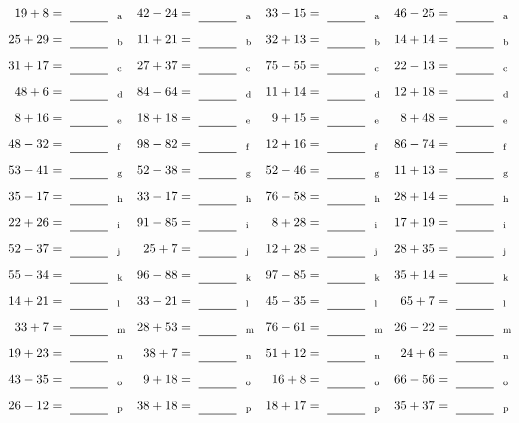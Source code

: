 \documentclass
[
  draft    = true,
  fontsize = 11pt,
  parskip  = half-
]
{scrartcl}
\begin{document}
\clearpage
\begin{align*}
    \pline{19+8}&=\rline{a}
  & \pline{42-24}&=\rline{a}
  & \pline{33-15}&=\rline{a}
  & \pline{46-25}&=\rline{a} \\[1ex]
    \pline{25+29}&=\rline{b}
  & \pline{11+21}&=\rline{b}
  & \pline{32+13}&=\rline{b}
  & \pline{14+14}&=\rline{b} \\[1ex]
    \pline{31+17}&=\rline{c}
  & \pline{27+37}&=\rline{c}
  & \pline{75-55}&=\rline{c}
  & \pline{22-13}&=\rline{c} \\[1ex]
    \pline{48+6}&=\rline{d}
  & \pline{84-64}&=\rline{d}
  & \pline{11+14}&=\rline{d}
  & \pline{12+18}&=\rline{d} \\[1ex]
    \pline{8+16}&=\rline{e}
  & \pline{18+18}&=\rline{e}
  & \pline{9+15}&=\rline{e}
  & \pline{8+48}&=\rline{e} \\[1ex]
    \pline{48-32}&=\rline{f}
  & \pline{98-82}&=\rline{f}
  & \pline{12+16}&=\rline{f}
  & \pline{86-74}&=\rline{f} \\[1ex]
    \pline{53-41}&=\rline{g}
  & \pline{52-38}&=\rline{g}
  & \pline{52-46}&=\rline{g}
  & \pline{11+13}&=\rline{g} \\[1ex]
    \pline{35-17}&=\rline{h}
  & \pline{33-17}&=\rline{h}
  & \pline{76-58}&=\rline{h}
  & \pline{28+14}&=\rline{h} \\[1ex]
    \pline{22+26}&=\rline{i}
  & \pline{91-85}&=\rline{i}
  & \pline{8+28}&=\rline{i}
  & \pline{17+19}&=\rline{i} \\[1ex]
    \pline{52-37}&=\rline{j}
  & \pline{25+7}&=\rline{j}
  & \pline{12+28}&=\rline{j}
  & \pline{28+35}&=\rline{j} \\[1ex]
    \pline{55-34}&=\rline{k}
  & \pline{96-88}&=\rline{k}
  & \pline{97-85}&=\rline{k}
  & \pline{35+14}&=\rline{k} \\[1ex]
    \pline{14+21}&=\rline{l}
  & \pline{33-21}&=\rline{l}
  & \pline{45-35}&=\rline{l}
  & \pline{65+7}&=\rline{l} \\[1ex]
    \pline{33+7}&=\rline{m}
  & \pline{28+53}&=\rline{m}
  & \pline{76-61}&=\rline{m}
  & \pline{26-22}&=\rline{m} \\[1ex]
    \pline{19+23}&=\rline{n}
  & \pline{38+7}&=\rline{n}
  & \pline{51+12}&=\rline{n}
  & \pline{24+6}&=\rline{n} \\[1ex]
    \pline{43-35}&=\rline{o}
  & \pline{9+18}&=\rline{o}
  & \pline{16+8}&=\rline{o}
  & \pline{66-56}&=\rline{o} \\[1ex]
    \pline{26-12}&=\rline{p}
  & \pline{38+18}&=\rline{p}
  & \pline{18+17}&=\rline{p}
  & \pline{35+37}&=\rline{p}
\end{align*}
\end{document}
